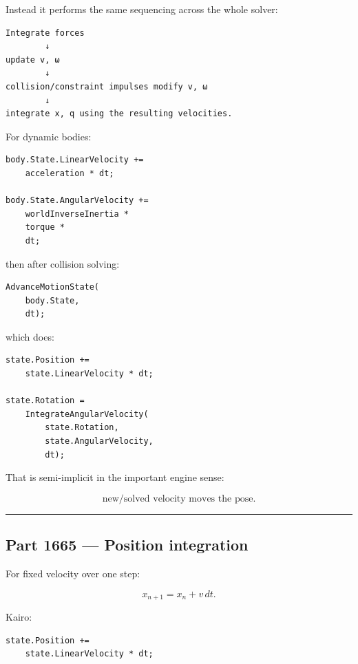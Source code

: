 Instead it performs the same sequencing across the whole solver:

\begin{verbatim}
Integrate forces
        ↓
update v, ω
        ↓
collision/constraint impulses modify v, ω
        ↓
integrate x, q using the resulting velocities.
\end{verbatim}

For dynamic bodies:

\begin{verbatim}
body.State.LinearVelocity +=
    acceleration * dt;

body.State.AngularVelocity +=
    worldInverseInertia *
    torque *
    dt;
\end{verbatim}

then after collision solving:

\begin{verbatim}
AdvanceMotionState(
    body.State,
    dt);
\end{verbatim}

which does:

\begin{verbatim}
state.Position +=
    state.LinearVelocity * dt;

state.Rotation =
    IntegrateAngularVelocity(
        state.Rotation,
        state.AngularVelocity,
        dt);
\end{verbatim}

That is semi-implicit in the important engine sense:

\[
\boxed{
\text{new/solved velocity moves the pose.}
}
\]

\begin{center}\rule{0.5\linewidth}{0.5pt}\end{center}

\subsection{Part 1665 --- Position integration}\label{06-engine-ii-ch037-part-1665-position-integration}

\hypertarget{06-engine-ii-ch037-part-1665-position-integration}{}

For fixed velocity over one step:

\[
\boxed{
x_{n+1}
=
x_n+v\,dt.
}
\]

Kairo:

\begin{verbatim}
state.Position +=
    state.LinearVelocity * dt;
\end{verbatim}

